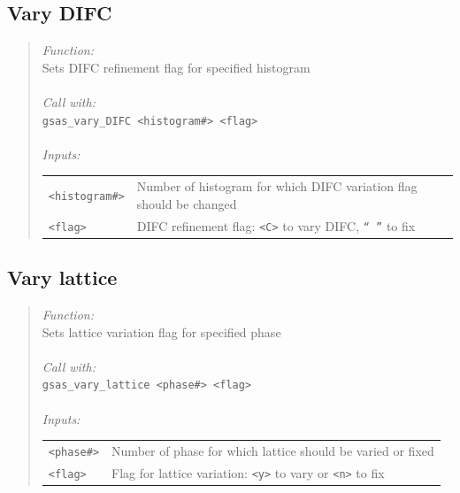 \documentclass{article}
\begin{document}
\subsection{Vary DIFC}
\begin{quote}
\textit{Function:} \\
Sets DIFC refinement flag for specified histogram \\ \\
\textit{Call with:} \\
\texttt{gsas\_vary\_DIFC <histogram\#> <flag>} \\ \\
\textit{Inputs:}\\
\begin{tabular}[t]{l l}
\texttt{<histogram\#>} &  Number of histogram for which DIFC variation flag should be changed \\
\texttt{<flag>} & DIFC refinement flag: \texttt{<C>} to vary DIFC,
\texttt{`` ''} to fix \\ 
\end{tabular}
\end{quote}

\subsection{Vary lattice}
\begin{quote}
\textit{Function:} \\
Sets lattice variation flag for specified phase \\ \\
\textit{Call with:}\\
\texttt{gsas\_vary\_lattice <phase\#> <flag>} \\ \\
\textit{Inputs:} \\
\begin{tabular}[t]{l l} 
\texttt{<phase\#>} &  Number of phase for which lattice should be varied or fixed \\
\texttt{<flag>} &  Flag for lattice variation: \texttt{<y>} to vary or \texttt{<n>} to fix \\
\end{tabular}
\end{quote}

\end{document}
